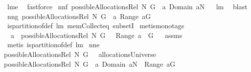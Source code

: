 \begin{isabellebody}
%
\isadelimproof
%
\endisadelimproof
%
\isatagproof
{}\isamarkupfalse%
\ lm{}{}e\ \isamarkupfalse%
\ fastforce%
\endisatagproof
{\isafoldproof}%
%
\isadelimproof
\isanewline
%
\endisadelimproof
{}\isamarkupfalse%
\ nn{}{}f{\isacharcolon}\ {\isachardoublequoteopen}possibleAllocationsRel\ N\ G\ {\isasymsubseteq}\ {\isacharbraceleft}a{\isachardot}\ Domain\ a{\isasymsubseteq}N{\isacharbraceright}{\isachardoublequoteclose}%
\isadelimproof
\ %
\endisadelimproof
%
\isatagproof
{}\isamarkupfalse%
\ lm{}{}\ \isamarkupfalse%
\ blast%
\endisatagproof
{\isafoldproof}%
%
\isadelimproof
%
\endisadelimproof
\isanewline
{}\isamarkupfalse%
\ nn{}{}g{\isacharcolon}\ {\isachardoublequoteopen}possibleAllocationsRel\ N\ G\ {\isasymsubseteq}\ {\isacharbraceleft}a{\isachardot}\ {\isasymUnion}Range\ a{\isacharequal}G{\isacharbraceright}{\isachardoublequoteclose}%
\isadelimproof
\ %
\endisadelimproof
%
\isatagproof
{}\isamarkupfalse%
\ is{\isacharunderscore}partition{\isacharunderscore}of{\isacharunderscore}def\ lm{}{}\ mem{\isacharunderscore}Collect{\isacharunderscore}eq\ subsetI\isanewline
{}\isamarkupfalse%
\ {\isacharparenleft}metis{\isacharparenleft}mono{\isacharunderscore}tags{\isacharparenright}{\isacharparenright}%
\endisatagproof
{\isafoldproof}%
%
\isadelimproof
%
\endisadelimproof
\isanewline
{}\isamarkupfalse%
\ \ {\isachardoublequoteopen}a\ {\isasymin}\ possibleAllocationsRel\ N\ G{\isachardoublequoteclose}\ \ {\isachardoublequoteopen}{\isasymUnion}\ Range\ a\ {\isacharequal}\ G{\isachardoublequoteclose}%
\isadelimproof
\ %
\endisadelimproof
%
\isatagproof
{}\isamarkupfalse%
\ assms\ \isanewline
{}\isamarkupfalse%
\ {\isacharparenleft}metis\ is{\isacharunderscore}partition{\isacharunderscore}of{\isacharunderscore}def\ lm{}{}{\isacharparenright}%
\endisatagproof
{\isafoldproof}%
%
\isadelimproof
%
\endisadelimproof
\isanewline
{}\isamarkupfalse%
\ nn{}{}e{\isacharcolon}\ {\isachardoublequoteopen}\isanewline
possibleAllocationsRel\ N\ G\ {\isasymsubseteq}\ \ allocationsUniverse\ {\isacharampersand}\isanewline
possibleAllocationsRel\ N\ G\ {\isasymsubseteq}\ {\isacharbraceleft}a{\isachardot}\ Domain\ a{\isasymsubseteq}N\ {\isacharampersand}\ {\isasymUnion}Range\ a{\isacharequal}G{\isacharbraceright}{\isachardoublequoteclose}%

\end{isabellebody}

